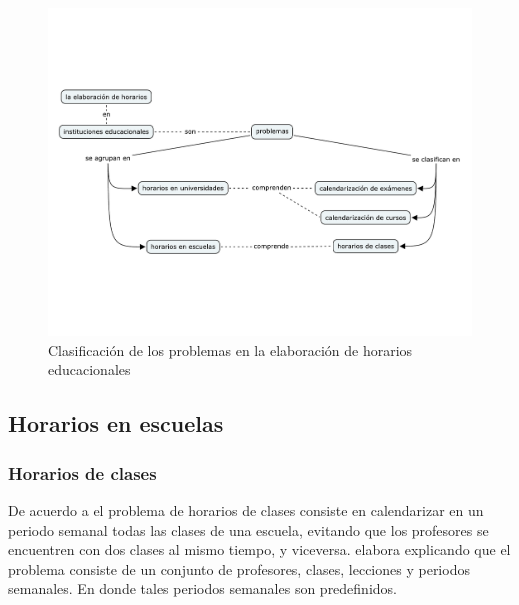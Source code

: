 \documentclass[draft,12pt,headsepline,footsepline,paper=letter]{scrreprt}
\begin{document}
\begin{figure}[hbtp]
\centering
\includegraphics[width=.8\textwidth, trim=0 140 0 140]{timetabling_classification.pdf}
\caption[Clasificación del problema]{Clasificación de los problemas en la elaboración de horarios educacionales}
\label{fig:timetabling_classification}
\end{figure}

\subsection{Horarios en escuelas}


\subsubsection{Horarios de clases}

De acuerdo a \citet[p.~88]{schaerf99a-survey-of-automated} el problema de horarios de clases consiste en calendarizar en un periodo semanal todas las clases de una escuela, evitando que los profesores se encuentren con dos clases al mismo tiempo, y viceversa. \citet[p.~10,11]{abdullah06heuristic-approaches} elabora explicando que el problema consiste de un conjunto de profesores, clases, lecciones y periodos semanales. En donde tales periodos semanales son predefinidos.
\end{document}
